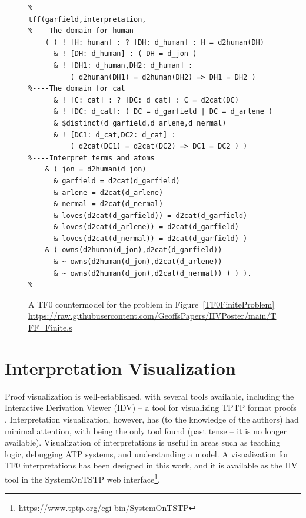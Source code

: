 \documentclass[letterpaper]{article}
\begin{document}
{\begin{figure}[htbp]
\scriptsize
{}
\begin{verbatim}
%--------------------------------------------------------
tff(garfield,interpretation,
%----The domain for human
    ( ( ! [H: human] : ? [DH: d_human] : H = d2human(DH)
      & ! [DH: d_human] : ( DH = d_jon )
      & ! [DH1: d_human,DH2: d_human] :
          ( d2human(DH1) = d2human(DH2) => DH1 = DH2 )
%----The domain for cat
      & ! [C: cat] : ? [DC: d_cat] : C = d2cat(DC)
      & ! [DC: d_cat]: ( DC = d_garfield | DC = d_arlene )
      & $distinct(d_garfield,d_arlene,d_nermal)
      & ! [DC1: d_cat,DC2: d_cat] :
          ( d2cat(DC1) = d2cat(DC2) => DC1 = DC2 ) )
%----Interpret terms and atoms
    & ( jon = d2human(d_jon)
      & garfield = d2cat(d_garfield)
      & arlene = d2cat(d_arlene)
      & nermal = d2cat(d_nermal)
      & loves(d2cat(d_garfield)) = d2cat(d_garfield)
      & loves(d2cat(d_arlene)) = d2cat(d_garfield)
      & loves(d2cat(d_nermal)) = d2cat(d_garfield) )
    & ( owns(d2human(d_jon),d2cat(d_garfield))
      & ~ owns(d2human(d_jon),d2cat(d_arlene))
      & ~ owns(d2human(d_jon),d2cat(d_nermal)) ) ) ).
%--------------------------------------------------------
\end{verbatim}
\caption{A TF0 countermodel for the problem in Figure~\ref{TF0FiniteProblem} \\
{\scriptsize \url{https://raw.githubusercontent.com/GeoffsPapers/IIVPoster/main/TFF_Finite.s}}}
\label{TF0FiniteInterpretation}
\end{figure}

\section{Interpretation Visualization}
\label{Visualization}

Proof visualization is well-established, with several tools available, including the Interactive 
Derivation Viewer (IDV) -- a tool for visualizing TPTP format proofs \cite{TPS07}.
Interpretation visualization, however, has (to the knowledge of the authors) had minimal 
attention, with \cite{Sch13-MS} being the only tool found (past tense -- it is no longer
available).
Visualization of interpretations is useful in areas such as teaching logic, debugging ATP 
systems, and understanding a model.
A visualization for TF0 interpretations has been designed in this work,
and it is available as the IIV tool in the SystemOnTSTP web interface\footnote{%
\url{https://www.tptp.org/cgi-bin/SystemOnTSTP}}.

}
\end{document}
